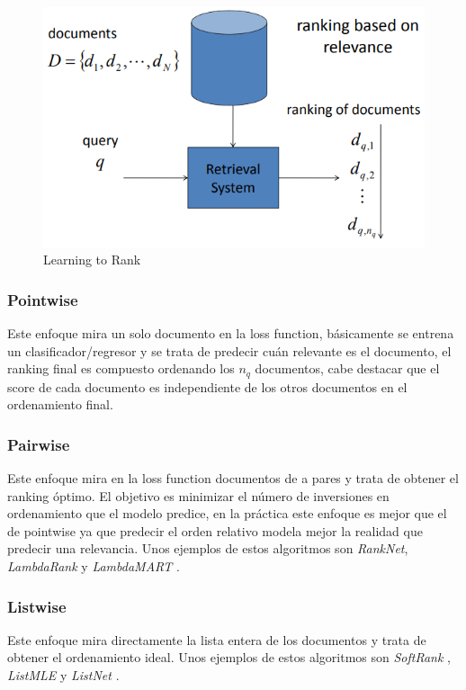 \begin{figure}
\begin{center}
    \includegraphics[width=\textwidth]{images/image207.png}
    \caption{Learning to Rank}
    \label{fig:learning_to_rank}
\end{center}
\end{figure}

\subsubsection{Pointwise}

Este enfoque mira un solo documento en la loss function, básicamente se entrena un clasificador/regresor y se trata de predecir cuán relevante es el documento, el ranking final es compuesto ordenando los $n_{q}$ documentos, cabe destacar que el score de cada documento es independiente de los otros documentos en el ordenamiento final.

\subsubsection{Pairwise} \label{sec:pairwise}

Este enfoque mira en la loss function documentos de a pares y trata de obtener el ranking óptimo. El objetivo es minimizar el número de inversiones en ordenamiento que el modelo predice, en la práctica este enfoque es mejor que el de pointwise ya que predecir el orden relativo modela mejor la realidad que predecir una relevancia. Unos ejemplos de estos algoritmos son \textit{RankNet}, \textit{LambdaRank} y \textit{LambdaMART} \cite{burges2010from}.

\subsubsection{Listwise} \label{sec:listwise}

Este enfoque mira directamente la lista entera de los documentos y trata de obtener el ordenamiento ideal. Unos ejemplos de estos algoritmos son \textit{SoftRank} \cite{taylor2008softrank}, \textit{ListMLE} \cite{inproceedings} y \textit{ListNet} \cite{cao2007learning}.
